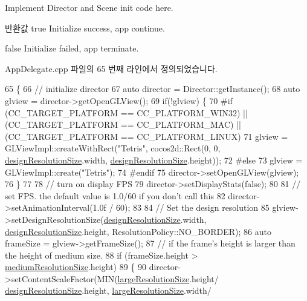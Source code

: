 Implement Director and Scene init code here. 

\begin{DoxyReturn}{반환값}
true Initialize success, app continue. 

false Initialize failed, app terminate. 
\end{DoxyReturn}


App\+Delegate.\+cpp 파일의 65 번째 라인에서 정의되었습니다.


\begin{DoxyCode}
65                                                 \{
66     \textcolor{comment}{// initialize director}
67     \textcolor{keyword}{auto} director = Director::getInstance();
68     \textcolor{keyword}{auto} glview = director->getOpenGLView();
69     \textcolor{keywordflow}{if}(!glview) \{
70 \textcolor{preprocessor}{#if (CC\_TARGET\_PLATFORM == CC\_PLATFORM\_WIN32) || (CC\_TARGET\_PLATFORM == CC\_PLATFORM\_MAC) ||
       (CC\_TARGET\_PLATFORM == CC\_PLATFORM\_LINUX)}
71         glview = GLViewImpl::createWithRect(\textcolor{stringliteral}{"Tetris"}, cocos2d::Rect(0, 0, 
      \hyperlink{_app_delegate_8cpp_a14515fff3914933cbc185cea12f1c54c}{designResolutionSize}.width, \hyperlink{_app_delegate_8cpp_a14515fff3914933cbc185cea12f1c54c}{designResolutionSize}.height));
72 \textcolor{preprocessor}{#else}
73         glview = GLViewImpl::create(\textcolor{stringliteral}{"Tetris"});
74 \textcolor{preprocessor}{#endif}
75         director->setOpenGLView(glview);
76     \}
77 
78     \textcolor{comment}{// turn on display FPS}
79     director->setDisplayStats(\textcolor{keyword}{false});
80 
81     \textcolor{comment}{// set FPS. the default value is 1.0/60 if you don't call this}
82     director->setAnimationInterval(1.0f / 60);
83 
84     \textcolor{comment}{// Set the design resolution}
85     glview->setDesignResolutionSize(\hyperlink{_app_delegate_8cpp_a14515fff3914933cbc185cea12f1c54c}{designResolutionSize}.width, 
      \hyperlink{_app_delegate_8cpp_a14515fff3914933cbc185cea12f1c54c}{designResolutionSize}.height, ResolutionPolicy::NO\_BORDER);
86     \textcolor{keyword}{auto} frameSize = glview->getFrameSize();
87     \textcolor{comment}{// if the frame's height is larger than the height of medium size.}
88     \textcolor{keywordflow}{if} (frameSize.height > \hyperlink{_app_delegate_8cpp_a50eb9194b9f3d6f1b94424ff16c13686}{mediumResolutionSize}.height)
89     \{        
90         director->setContentScaleFactor(MIN(\hyperlink{_app_delegate_8cpp_a2c26c0769aed4c8c6caa56bdaee25055}{largeResolutionSize}.height/
      \hyperlink{_app_delegate_8cpp_a14515fff3914933cbc185cea12f1c54c}{designResolutionSize}.height, \hyperlink{_app_delegate_8cpp_a2c26c0769aed4c8c6caa56bdaee25055}{largeResolutionSize}.width/

\end{DoxyCode}
